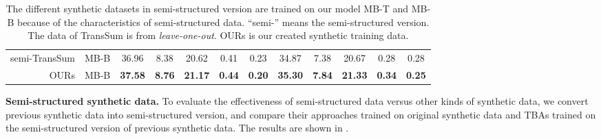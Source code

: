 {\begin{table}[th]
\begin{center}
\begin{tabular}{|r|c|c|c|c|c|c|c|c|c|c|c|}
			semi-TransSum& MB-B & 36.96& 8.38 & 20.62 & 0.41 & 0.23 & 34.87 & 7.38 &  20.67& 0.28 & 0.28 \\
			OURs& MB-B & \bf 37.58 & \bf 8.76 & \bf 21.17 & \bf 0.44 & \bf 0.20 & \bf 35.30 & \bf 7.84 & \bf 21.33 & \bf 0.34 & \bf 0.25 \\ 
			\hline
		\end{tabular}
	\end{center}
	\caption{The different synthetic datasets in semi-structured version
		are trained on our model MB-T and MB-B because of the characteristics of semi-structured data. ``semi-'' means the semi-structured version. The data of TransSum is from {\em leave-one-out}. OURs is our created synthetic training data.}
	\label{tab:traindata}  
\end{table}
}%

\textbf{Semi-structured synthetic data.}
To evaluate the effectiveness of semi-structured data versus
other kinds of synthetic data,
we convert previous synthetic data into semi-structured version, and compare their approaches trained on original synthetic data
and TBAs trained on the semi-structured version of previous synthetic data.
The results are shown in 
.%

